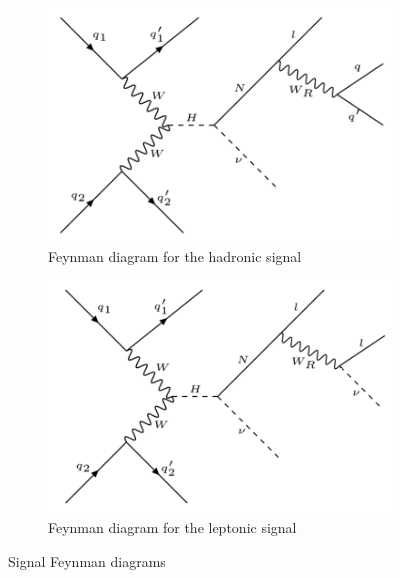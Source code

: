 \begin{figure}[h]
\centering
\begin{subfigure}{.5\textwidth}
  \centering
  \includegraphics[width=1\linewidth]{./Capitulos/Model/hadron_signal}
  \caption{Feynman diagram for the hadronic signal}
  \label{signal_hadron_feynman}
\end{subfigure}%
\begin{subfigure}{.5\textwidth}
  \centering
  \includegraphics[width=1\linewidth]{./Capitulos/Model/leptonic_signal}
  \caption{Feynman diagram for the leptonic signal}
  \label{signal_leptonic_feynman}
\end{subfigure}
\caption{Signal Feynman diagrams}
\label{signals}
\end{figure}


